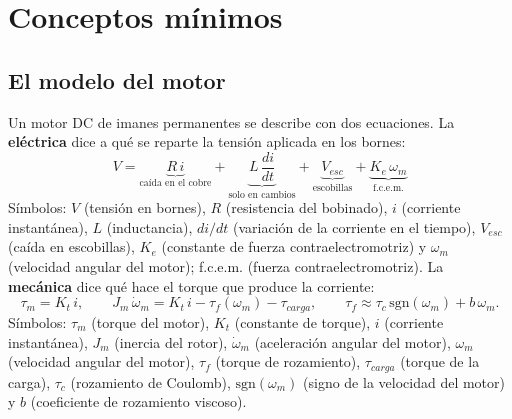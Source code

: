 \documentclass[11pt,a4paper]{article}
\begin{document}
\section{Conceptos mínimos}
\label{sec:conceptos}

\subsection{El modelo del motor}

Un motor DC de imanes permanentes se describe con dos ecuaciones. La \textbf{eléctrica} dice a qué se reparte la tensión aplicada en los bornes:
\begin{equation}
V = \underbrace{R\,i}_{\text{caída en el cobre}} + \underbrace{L\,\frac{di}{dt}}_{\text{solo en cambios}} + \underbrace{V_{esc}}_{\text{escobillas}} + \underbrace{K_e\,\omega_m}_{\text{f.c.e.m.}}
\label{eq:electrica}
\end{equation}
Símbolos: $V$ (tensión en bornes), $R$ (resistencia del bobinado), $i$ (corriente instantánea), $L$ (inductancia), $di/dt$ (variación de la corriente en el tiempo), $V_{esc}$ (caída en escobillas), $K_e$ (constante de fuerza contraelectromotriz) y $\omega_m$ (velocidad angular del motor); f.c.e.m. (fuerza contraelectromotriz).
La \textbf{mecánica} dice qué hace el torque que produce la corriente:
\begin{equation}
\tau_m = K_t\, i, \qquad J_m\,\dot\omega_m = K_t\,i - \tau_f(\omega_m) - \tau_{carga},\qquad \tau_f \approx \tau_c\,\mathrm{sgn}(\omega_m) + b\,\omega_m .
\label{eq:mecanica}
\end{equation}
Símbolos: $\tau_m$ (torque del motor), $K_t$ (constante de torque), $i$ (corriente instantánea), $J_m$ (inercia del rotor), $\dot\omega_m$ (aceleración angular del motor), $\omega_m$ (velocidad angular del motor), $\tau_f$ (torque de rozamiento), $\tau_{carga}$ (torque de la carga), $\tau_c$ (rozamiento de Coulomb), $\mathrm{sgn}(\omega_m)$ (signo de la velocidad del motor) y $b$ (coeficiente de rozamiento viscoso).
\end{document}
